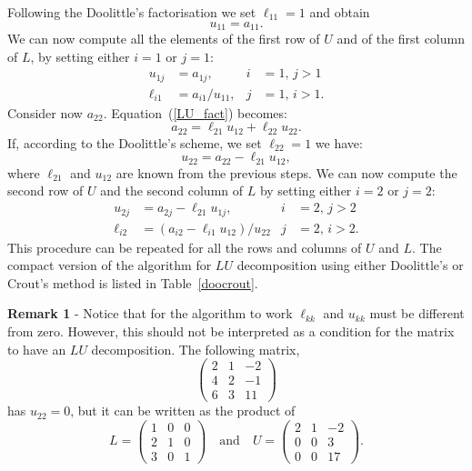 Following the Doolittle's factorisation we set $\ell_{1 1} = 1$ and
obtain
%
\begin{equation*}
  u_{1 1} = a_{1 1} . 
\end{equation*}
%
We can now compute all the elements of the first row of $U$ and of the
first column of $L$, by setting either $i=1$ or $j=1$:
%
\begin{align}
  u_{1 j} & = a_{1 j} , & i & = 1, \, j > 1 \\
  \ell_{i 1} &= a_{i 1} / u_{1 1} , & j & = 1, \, i > 1 .
\end{align}
%
Consider now $a_{2 2}$.   Equation~(\ref{LU_fact}) becomes:
%
\begin{equation*}
  a_{2 2} = \ell_{2 1} u_{1 2} + \ell_{2 2} u_{2 2} . 
\end{equation*}
%
If, according to the Doolittle's scheme, we set $\ell_{2 2} = 1$ we
have:
%
\begin{equation*}
  u_{2 2} = a_{2 2} - \ell_{2 1} u_{1 2} , 
\end{equation*}
%
where $\ell_{2 1}$ and $u_{1 2}$ are known from the previous steps.
We can now compute the second row of $U$ and the second column of $L$
by setting either $i=2$ or $j=2$:
%
\begin{align}
  u_{2 j} & = a_{2 j} - \ell_{2 1} u_{1 j}, & i & = 2, \, j > 2 \\
  \ell_{i 2} & = \left ( a_{i 2} - \ell_{i 1} u_{1 2} \right )/ u_{2
    2} & j & = 2, \, i > 2.
\end{align}
%
This procedure can be repeated for all the rows and columns of $U$ and
$L$.   The compact version of the algorithm for $LU$ decomposition using
either Doolittle's or Crout's method is listed in
Table~\ref{doocrout}.


\smallskip

\noindent \textbf{Remark 1} - Notice that for the algorithm to work
$\ell_{k k}$ and $u_{k k}$ must be different from zero.  However, this
should not be interpreted as a condition for the matrix to have an
$LU$ decomposition.   The following matrix,
%
\begin{equation*}
  \begin{pmatrix}
    2 & 1 & -2 \\ 4 & 2 & -1 \\ 6 & 3 & 11
  \end{pmatrix}
\end{equation*}
%
has $u_{2 2} =0 $, but it can be written as the product of
%
\begin{equation*}
  L =
  \begin{pmatrix}
    1 & 0 & 0 \\ 2 & 1 & 0 \\ 3 & 0 & 1
  \end{pmatrix}
  \quad \text{and} \quad
  U =
  \begin{pmatrix}
    2 & 1 & -2 \\ 0 & 0 & 3 \\ 0 & 0 & 17
  \end{pmatrix} .
\end{equation*}


